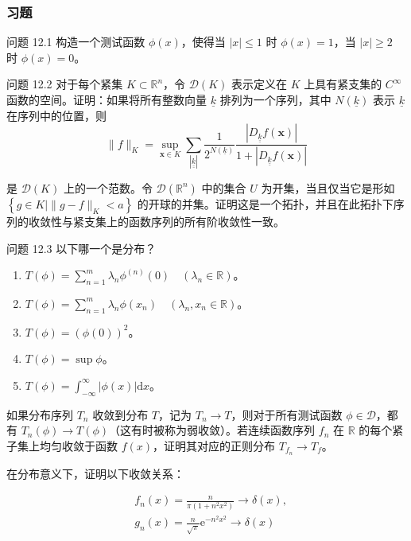 \subsubsection{习题}
\begin{problem}
  问题 12.1 构造一个测试函数 $\phi(x)$，使得当 $|x| \leq 1$ 时
$\phi(x) = 1$，当 $|x| \geq 2$ 时 $\phi(x) = 0$。
\end{problem}

\begin{problem}
  问题 12.2 对于每个紧集 $K \subset \mathbb{R}^n$，令 $\mathcal{D}(K)$
表示定义在 $K$ 上具有紧支集的 $C^{\infty}$
函数的空间。证明：如果将所有整数向量 $\underline{k}$
排列为一个序列，其中 $N(\underline{k})$ 表示 $\underline{k}$
在序列中的位置，则
  $$
\|f\|_{K}=\sup _{\mathbf{x} \in K} \sum_{|\underline{\underline{k}}|} \frac{1}{2^{N(\underline{k})}} \frac{\left|D_{\underline{\underline{k}}} f(\mathbf{x})\right|}{1+\left|D_{\underline{\underline{k}}} f(\mathbf{x})\right|}
$$

是 $\mathcal{D}(K)$ 上的一个范数。令 $\mathcal{D}(\mathbb{R}^n)$
中的集合 $U$ 为开集，当且仅当它是形如
$\left\{g \in K \mid\|g-f\|_{K}<a\right\}$
的开球的并集。证明这是一个拓扑，并且在此拓扑下序列的收敛性与紧支集上的函数序列的所有阶收敛性一致。

\end{problem}
\begin{problem}
  问题 12.3 以下哪一个是分布？

\begin{enumerate}
\def\labelenumi{(\alph{enumi})}
\item
  $T(\phi)=\sum_{n=1}^{m} \lambda_{n} \phi^{(n)}(0) \quad\left(\lambda_{n} \in \mathbb{R}\right)$。
\item
  $T(\phi)=\sum_{n=1}^{m} \lambda_{n} \phi\left(x_{n}\right) \quad\left(\lambda_{n}, x_{n} \in \mathbb{R}\right)$。
\item
  $T(\phi)=(\phi(0))^{2}$。
\item
  $T(\phi)=\sup \phi$。
\item
  $T(\phi)=\int_{-\infty}^{\infty}|\phi(x)| \mathrm{d} x$。
\end{enumerate}

\end{problem}
\begin{problem}\label{pro:12.4}
  如果分布序列 $T_{n}$ 收敛到分布 $T$，记为
$T_{n} \rightarrow T$，则对于所有测试函数
$\phi \in \mathcal{D}$，都有
$T_{n}(\phi) \rightarrow T(\phi)$（这有时被称为弱收敛）。若连续函数序列
$f_n$ 在 $\mathbb{R}$ 的每个紧子集上均匀收敛于函数
$f(x)$，证明其对应的正则分布 $T_{f_n} \rightarrow T_{f}$。

在分布意义下，证明以下收敛关系：

$$
\begin{aligned}
& f_{n}(x)=\frac{n}{\pi\left(1+n^{2} x^{2}\right)} \rightarrow \delta(x), \\
& g_{n}(x)=\frac{n}{\sqrt{\pi}} \mathrm{e}^{-n^{2} x^{2}} \rightarrow \delta(x)
\end{aligned}
$$
\end{problem}

